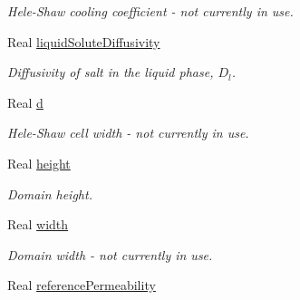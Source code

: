 \begin{DoxyCompactItemize}
\begin{DoxyCompactList}\small\item\em Hele-\/\-Shaw cooling coefficient -\/ not currently in use. \end{DoxyCompactList}\item 
\hypertarget{class_mushy_layer_params_aeb3d05c0fc784e2fbe216e2ca086d5e1}{Real \hyperlink{class_mushy_layer_params_aeb3d05c0fc784e2fbe216e2ca086d5e1}{liquid\-Solute\-Diffusivity}}\label{class_mushy_layer_params_aeb3d05c0fc784e2fbe216e2ca086d5e1}

\begin{DoxyCompactList}\small\item\em Diffusivity of salt in the liquid phase, $ D_l $. \end{DoxyCompactList}\item 
\hypertarget{class_mushy_layer_params_a5016899efd8d969b2f65c20a3239fbe7}{Real \hyperlink{class_mushy_layer_params_a5016899efd8d969b2f65c20a3239fbe7}{d}}\label{class_mushy_layer_params_a5016899efd8d969b2f65c20a3239fbe7}

\begin{DoxyCompactList}\small\item\em Hele-\/\-Shaw cell width -\/ not currently in use. \end{DoxyCompactList}\item 
\hypertarget{class_mushy_layer_params_ae6c806a4560f2711543ba1a9b72e7d76}{Real \hyperlink{class_mushy_layer_params_ae6c806a4560f2711543ba1a9b72e7d76}{height}}\label{class_mushy_layer_params_ae6c806a4560f2711543ba1a9b72e7d76}

\begin{DoxyCompactList}\small\item\em Domain height. \end{DoxyCompactList}\item 
\hypertarget{class_mushy_layer_params_a90af7620cab61b798af5843f8b003386}{Real \hyperlink{class_mushy_layer_params_a90af7620cab61b798af5843f8b003386}{width}}\label{class_mushy_layer_params_a90af7620cab61b798af5843f8b003386}

\begin{DoxyCompactList}\small\item\em Domain width -\/ not currently in use. \end{DoxyCompactList}\item 
\hypertarget{class_mushy_layer_params_a8124873b3f9a1a5657b1b980b99d6b3b}{Real \hyperlink{class_mushy_layer_params_a8124873b3f9a1a5657b1b980b99d6b3b}{reference\-Permeability}}\label{class_mushy_layer_params_a8124873b3f9a1a5657b1b980b99d6b3b}


\end{DoxyCompactItemize}
